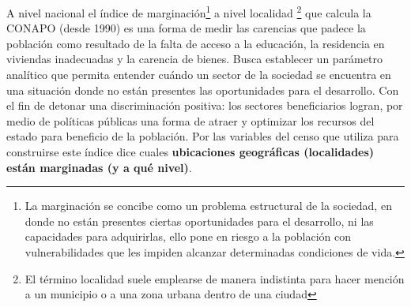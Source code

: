 \documentclass[paper=letter, fontsize=11pt]{scrartcl}
\numberwithin{equation}{section} %
\numberwithin{figure}{section} %
\numberwithin{table}{section} %
\begin{document}
\begin{enumerate}
A nivel nacional el índice de marginación\footnote{La marginación se concibe como un problema estructural de la sociedad, en donde
no están presentes ciertas oportunidades para el desarrollo, ni las capacidades para
adquirirlas, ello pone en riesgo a la población con vulnerabilidades que les impiden alcanzar determinadas condiciones de vida.} a nivel localidad \footnote{El término localidad suele emplearse de manera indistinta para hacer mención a un municipio o a una zona urbana dentro de una ciudad} que calcula la CONAPO (desde 1990) es una forma de medir las carencias que padece la población como resultado de la falta de acceso a la educación, la residencia en viviendas inadecuadas y la carencia de bienes.%
Busca establecer un parámetro analítico que permita entender cuándo un sector de la sociedad se encuentra en una situación donde no están presentes las oportunidades para el desarrollo. Con el fin de detonar una discriminación positiva: los sectores beneficiarios logran, por medio de políticas públicas una forma de atraer y optimizar los recursos del estado para beneficio de la población. Por las variables del censo que utiliza para construirse este índice dice cuales \textbf{ubicaciones geográficas (localidades) están marginadas (y a qué nivel)}.

\end{enumerate}
\end{document}

